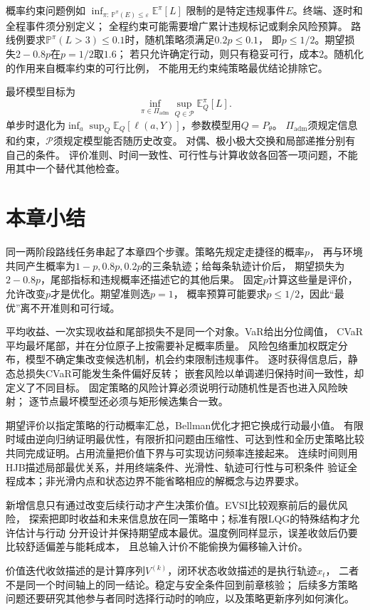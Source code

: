 概率约束问题例如
$\inf_{\pi:\,\mathbb P^\pi(E)\leq\varepsilon}\mathbb E^\pi[L]$
限制的是特定违规事件$E$。终端、逐时和全程事件须分别定义；
全程约束可能需要增广累计违规标记或剩余风险预算。
路线例要求$\mathbb P^\pi(L>3)\leq0.1$时，随机策略须满足$0.2p\leq0.1$，
即$p\leq1/2$。期望损失$2-0.8p$在$p=1/2$取$1.6$；
若只允许确定行动，则只有稳妥可行，成本$2$。随机化的作用来自概率约束的可行比例，
不能用无约束纯策略最优结论排除它。

最坏模型目标为
\[
  \inf_{\pi\in\Pi_{\mathrm{adm}}}
    \sup_{Q\in\mathcal P}\mathbb E_Q^\pi[L].
\]
单步时退化为$\inf_a\sup_Q\mathbb E_Q[\ell(a,Y)]$，参数模型用$Q=P_\theta$。
$\Pi_{\mathrm{adm}}$须规定信息和约束，$\mathcal P$须规定模型能否随历史改变。
对偶、极小极大交换和局部递推分别有自己的条件。
评价准则、时间一致性、可行性与计算收敛各回答一项问题，不能用其中一个替代其他检查。

\section{本章小结}
\label{sec:decision-theory-and-dynamic-risk-summary}

同一两阶段路线任务串起了本章四个步骤。策略先规定走捷径的概率$p$，
再与环境共同产生概率为$1-p,0.8p,0.2p$的三条轨迹；给每条轨迹计价后，
期望损失为$2-0.8p$，尾部指标和违规概率还描述它的其他后果。
固定$p$计算这些量是评价，允许改变$p$才是优化。期望准则选$p=1$，
概率预算可能要求$p\leq1/2$，因此“最优”离不开准则和可行域。

平均收益、一次实现收益和尾部损失不是同一个对象。VaR给出分位阈值，
CVaR平均最坏尾部，并在分位原子上按需要补足概率质量。
风险包络重加权既定分布，模型不确定集改变候选机制，机会约束限制违规事件。
逐时获得信息后，静态总损失CVaR可能发生条件偏好反转；
嵌套风险以单调递归保持时间一致性，却定义了不同目标。
固定策略的风险计算必须说明行动随机性是否也进入风险映射；
逐节点最坏模型还必须与矩形候选集合一致。

期望评价以指定策略的行动概率汇总，Bellman优化才把它换成行动最小值。
有限时域由逆向归纳证明最优性，有限折扣问题由压缩性、可达到性和全历史策略比较
共同完成证明。占用流量把价值下界与可实现访问频率连接起来。
连续时间则用HJB描述局部最优关系，并用终端条件、光滑性、轨迹可行性与可积条件
验证全程成本；非光滑内点和状态边界不能省略相应的解概念与边界要求。

新增信息只有通过改变后续行动才产生决策价值。EVSI比较观察前后的最优风险，
探索把即时收益和未来信息放在同一策略中；标准有限LQG的特殊结构才允许估计与行动
分开设计并保持期望成本最优。温度例同样显示，误差收敛后仍要比较舒适偏差与能耗成本，
且总输入计价不能偷换为偏移输入计价。

价值迭代收敛描述的是计算序列$V^{(k)}$，闭环状态收敛描述的是执行轨迹$x_t$，
二者不是同一个时间轴上的同一结论。稳定与安全条件回到前章核验；
后续多方策略问题还要研究其他参与者同时选择行动时的响应，以及策略更新序列如何演化。
